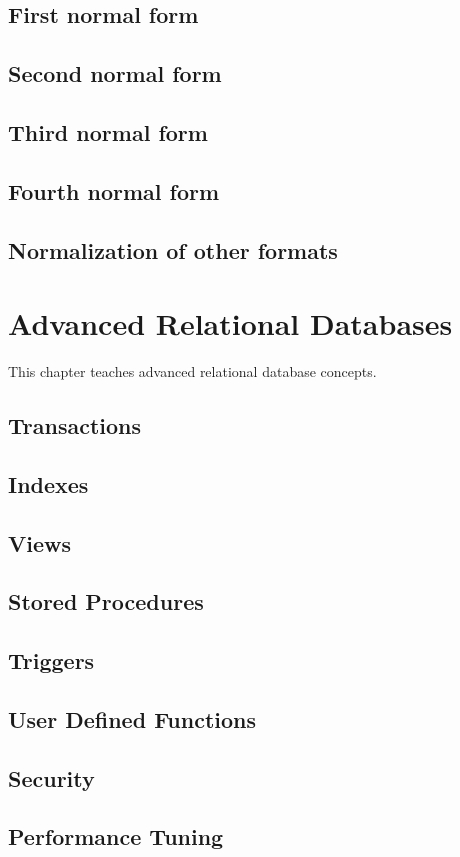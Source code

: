\section{First normal form}
\section{Second normal form}
\section{Third normal form}
\section{Fourth normal form}
\section{Normalization of other formats}

\chapter{Advanced Relational Databases}
\label{chap:relational:advanced-relational-databases}
This chapter teaches advanced relational database concepts.

\section{Transactions}
\section{Indexes}
\section{Views}
\section{Stored Procedures}
\section{Triggers}
\section{User Defined Functions}
\section{Security}
\section{Performance Tuning}


